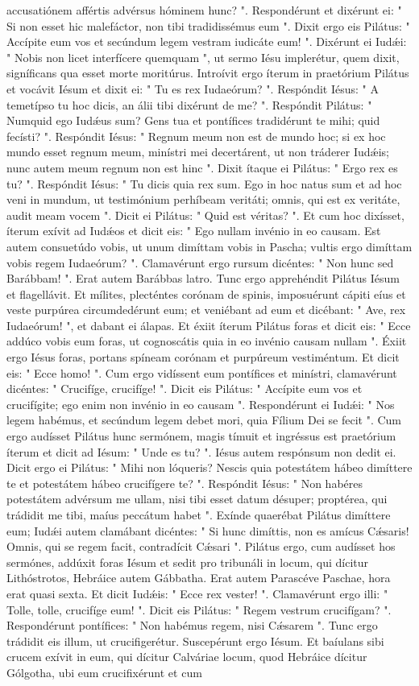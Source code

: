 accusatiónem affértis advérsus hóminem hunc? ". Respondérunt et dixérunt ei: " Si non esset hic malefáctor, non tibi tradidissémus eum ".  Dixit ergo eis Pilátus: " Accípite eum vos et secúndum legem vestram iudicáte eum! ". Dixérunt ei Iudǽi: " Nobis non licet interfícere quemquam ", ut sermo Iésu implerétur, quem dixit, signíficans qua esset morte moritúrus. Introívit ergo íterum in praetórium Pilátus et vocávit Iésum et dixit ei: " Tu es rex Iudaeórum? ". Respóndit Iésus: " A temetípso tu hoc dicis, an álii tibi dixérunt de me? ". Respóndit Pilátus: " Numquid ego Iudǽus sum? Gens tua et pontífices tradidérunt te mihi; quid fecísti? ". Respóndit Iésus: " Regnum meum non est de mundo hoc; si ex hoc mundo esset regnum meum, minístri mei decertárent, ut non tráderer Iudǽis; nunc autem meum regnum non est hinc ". Dixit ítaque ei Pilátus: " Ergo rex es tu? ". Respóndit Iésus: " Tu dicis quia rex sum. Ego in hoc natus sum et ad hoc veni in mundum, ut testimónium perhíbeam veritáti; omnis, qui est ex veritáte, audit meam vocem ". Dicit ei Pilátus: " Quid est véritas? ". Et cum hoc dixísset, íterum exívit ad Iudǽos et dicit eis: " Ego nullam invénio in eo causam. Est autem consuetúdo vobis, ut unum dimíttam vobis in Pascha; vultis ergo dimíttam vobis regem Iudaeórum? ". Clamavérunt ergo rursum dicéntes: " Non hunc sed Barábbam! ". Erat autem Barábbas latro. Tunc ergo apprehéndit Pilátus Iésum et flagellávit. Et mílites, plecténtes corónam de spinis, imposuérunt cápiti eíus et veste purpúrea circumdedérunt eum; et veniébant ad eum et dicébant: " Ave, rex Iudaeórum! ", et dabant ei álapas. Et éxiit íterum Pilátus foras et dicit eis: " Ecce addúco vobis eum foras, ut cognoscátis quia in eo invénio causam nullam ". Éxiit ergo Iésus foras, portans spíneam corónam et purpúreum vestiméntum. Et dicit eis: " Ecce homo! ". Cum ergo vidíssent eum pontífices et minístri, clamavérunt dicéntes: " Crucifíge, crucifíge! ". Dicit eis Pilátus: " Accípite eum vos et crucifígite; ego enim non invénio in eo causam ". Respondérunt ei Iudǽi: " Nos legem habémus, et secúndum legem debet mori, quia Fílium Dei se fecit ". Cum ergo audísset Pilátus hunc sermónem, magis tímuit et ingréssus est praetórium íterum et dicit ad Iésum: " Unde es tu? ". Iésus autem respónsum non dedit ei. Dicit ergo ei Pilátus: " Mihi non lóqueris? Nescis quia potestátem hábeo dimíttere te et potestátem hábeo crucifígere te? ". Respóndit Iésus: " Non habéres potestátem advérsum me ullam, nisi tibi esset datum désuper; proptérea, qui trádidit me tibi, maíus peccátum habet ". Exínde quaerébat Pilátus dimíttere eum; Iudǽi autem clamábant dicéntes: " Si hunc dimíttis, non es amícus Cǽsaris! Omnis, qui se regem facit, contradícit Cǽsari ". Pilátus ergo, cum audísset hos sermónes, addúxit foras Iésum et sedit pro tribunáli in locum, qui dícitur Lithóstrotos, Hebráice autem Gábbatha. Erat autem Parascéve Paschae, hora erat quasi sexta. Et dicit Iudǽis: " Ecce rex vester! ". Clamavérunt ergo illi: " Tolle, tolle, crucifíge eum! ". Dicit eis Pilátus: " Regem vestrum crucifígam? ". Respondérunt pontífices: " Non habémus regem, nisi Cǽsarem ". Tunc ergo trádidit eis illum, ut crucifigerétur. Suscepérunt ergo Iésum. Et baíulans sibi crucem exívit in eum, qui dícitur Calváriae locum, quod Hebráice dícitur Gólgotha, ubi eum crucifixérunt et cum 